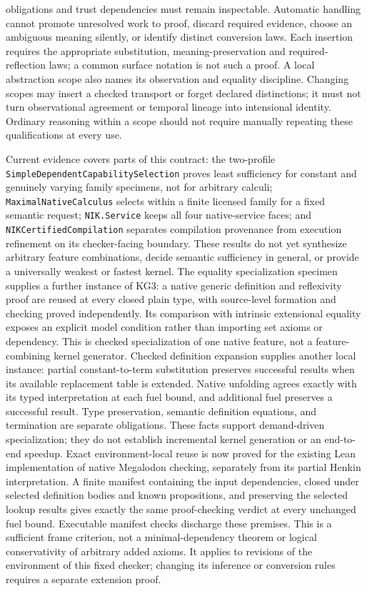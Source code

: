\documentclass[11pt]{article}
\theoremstyle{definition}
\theoremstyle{remark}
\begin{document}
\begin{description}[leftmargin=1.2cm,style=nextline]
  obligations and trust dependencies must remain inspectable. Automatic
  handling cannot promote unresolved work to proof, discard required evidence,
  choose an ambiguous meaning silently, or identify distinct conversion laws.
  Each insertion requires the appropriate substitution, meaning-preservation
  and required-reflection laws; a common surface notation is not such a proof.
  A local abstraction scope also names its observation and equality discipline.
  Changing scopes may insert a checked transport or forget declared distinctions;
  it must not turn observational agreement or temporal lineage into intensional
  identity. Ordinary reasoning within a scope should not require manually
  repeating these qualifications at every use.
\end{description}

Current evidence covers parts of this contract: the two-profile
\nolinkurl{SimpleDependentCapabilitySelection} proves least sufficiency for
constant and genuinely varying family specimens, not for arbitrary calculi;
\nolinkurl{MaximalNativeCalculus} selects within a finite licensed family for
a fixed semantic request; \nolinkurl{NIK.Service} keeps all four native-service
faces; and \nolinkurl{NIKCertifiedCompilation} separates compilation provenance
from execution refinement on its checker-facing boundary. These results do
not yet synthesize arbitrary feature combinations, decide semantic sufficiency
in general, or provide a universally weakest or fastest kernel.
The equality specialization specimen supplies a further instance of KG3:
a native generic definition and reflexivity proof are reused at every closed
plain type, with source-level formation and checking proved independently.
Its comparison with intrinsic extensional equality exposes an explicit model
condition rather than importing set axioms or dependency. This is checked
specialization of one native feature, not a feature-combining kernel generator.
Checked definition expansion supplies another local instance: partial
constant-to-term substitution preserves successful results when its available
replacement table is extended. Native unfolding agrees exactly with its typed
interpretation at each fuel bound, and additional fuel preserves a successful
result. Type preservation, semantic definition equations, and termination are
separate obligations. These facts support demand-driven specialization; they
do not establish incremental kernel generation or an end-to-end speedup.
Exact environment-local reuse is now proved for the existing Lean implementation
of native Megalodon checking, separately from its partial Henkin interpretation. A finite manifest
containing the input dependencies, closed under selected definition bodies and
known propositions, and preserving the selected lookup results gives exactly
the same proof-checking verdict at every unchanged fuel bound. Executable
manifest checks discharge these premises. This is a sufficient frame criterion,
not a minimal-dependency theorem or logical conservativity of arbitrary added
axioms. It applies to revisions of the environment of this fixed checker;
changing its inference or conversion rules requires a separate extension proof.
\end{document}
